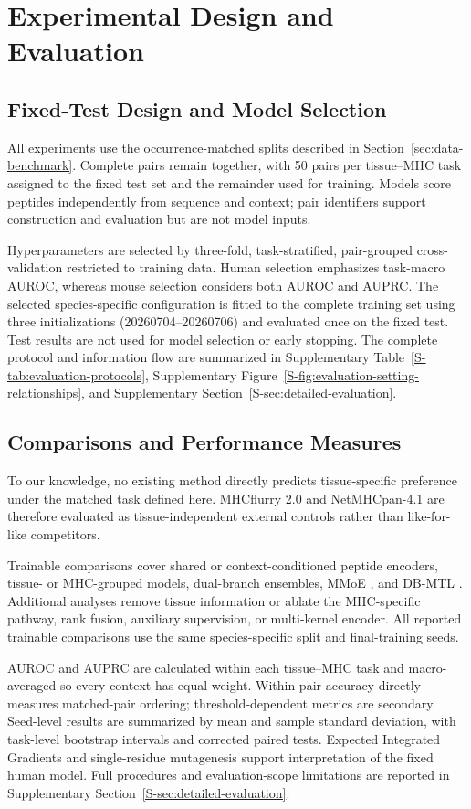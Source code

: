 \section{Experimental Design and Evaluation}
\label{sec:evaluation-protocol}

\subsection{Fixed-Test Design and Model Selection}

All experiments use the occurrence-matched splits described in Section~\ref{sec:data-benchmark}. Complete pairs remain together, with 50 pairs per tissue--MHC task assigned to the fixed test set and the remainder used for training. Models score peptides independently from sequence and context; pair identifiers support construction and evaluation but are not model inputs.

Hyperparameters are selected by three-fold, task-stratified, pair-grouped cross-validation restricted to training data. Human selection emphasizes task-macro AUROC, whereas mouse selection considers both AUROC and AUPRC. The selected species-specific configuration is fitted to the complete training set using three initializations (20260704--20260706) and evaluated once on the fixed test. Test results are not used for model selection or early stopping. The complete protocol and information flow are summarized in Supplementary Table~\ref{S-tab:evaluation-protocols}, Supplementary Figure~\ref{S-fig:evaluation-setting-relationships}, and Supplementary Section~\ref{S-sec:detailed-evaluation}.

\subsection{Comparisons and Performance Measures}

To our knowledge, no existing method directly predicts tissue-specific preference under the matched task defined here. MHCflurry 2.0 \cite{odonnell2020mhcflurry} and NetMHCpan-4.1 \cite{reynisson2020netmhcpan} are therefore evaluated as tissue-independent external controls rather than like-for-like competitors.

Trainable comparisons cover shared or context-conditioned peptide encoders, tissue- or MHC-grouped models, dual-branch ensembles, MMoE \cite{ma2018mmoe}, and DB-MTL \cite{lin2023dbmtl}. Additional analyses remove tissue information or ablate the MHC-specific pathway, rank fusion, auxiliary supervision, or multi-kernel encoder. All reported trainable comparisons use the same species-specific split and final-training seeds.

AUROC and AUPRC are calculated within each tissue--MHC task and macro-averaged so every context has equal weight. Within-pair accuracy directly measures matched-pair ordering; threshold-dependent metrics are secondary. Seed-level results are summarized by mean and sample standard deviation, with task-level bootstrap intervals and corrected paired tests. Expected Integrated Gradients \cite{sundararajan2017integrated,erion2021expected} and single-residue mutagenesis support interpretation of the fixed human model. Full procedures and evaluation-scope limitations are reported in Supplementary Section~\ref{S-sec:detailed-evaluation}.
